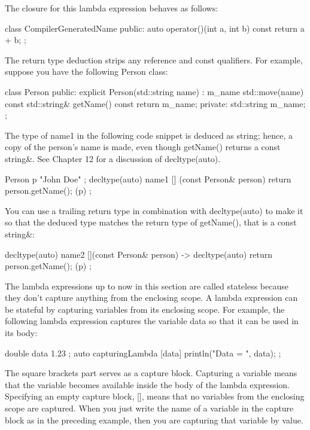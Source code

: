 The closure for this lambda expression behaves as follows:

\begin{cpp}
class CompilerGeneratedName
{
    public:
        auto operator()(int a, int b) const { return a + b; }
};
\end{cpp}

The return type deduction strips any reference and const qualifiers. For example, suppose you have the following Person class:

\begin{cpp}
class Person
{
    public:
        explicit Person(std::string name) : m_name { std::move(name) } { }
        const std::string& getName() const { return m_name; }
    private:
        std::string m_name;
};
\end{cpp}

The type of name1 in the following code snippet is deduced as string; hence, a copy of the person’s name is made, even though getName() returns a const string\&. See Chapter 12 for a discussion of decltype(auto).

\begin{cpp}
Person p { "John Doe" };
decltype(auto) name1 { [] (const Person& person) { return person.getName(); }(p) };
\end{cpp}

You can use a trailing return type in combination with decltype(auto) to make it so that the deduced type matches the return type of getName(), that is a const string\&:

\begin{cpp}
decltype(auto) name2 { [](const Person& person) -> decltype(auto) {
        return person.getName(); }(p) };
\end{cpp}

The lambda expressions up to now in this section are called stateless because they don’t capture anything from the enclosing scope. A lambda expression can be stateful by capturing variables from its enclosing scope. For example, the following lambda expression captures the variable data so that it can be used in its body:

\begin{cpp}
double data { 1.23 };
auto capturingLambda { [data]{ println("Data = {}", data); } };
\end{cpp}

The square brackets part serves as a capture block. Capturing a variable means that the variable becomes available inside the body of the lambda expression. Specifying an empty capture block, [], means that no variables from the enclosing scope are captured. When you just write the name of a variable in the capture block as in the preceding example, then you are capturing that variable by value.

